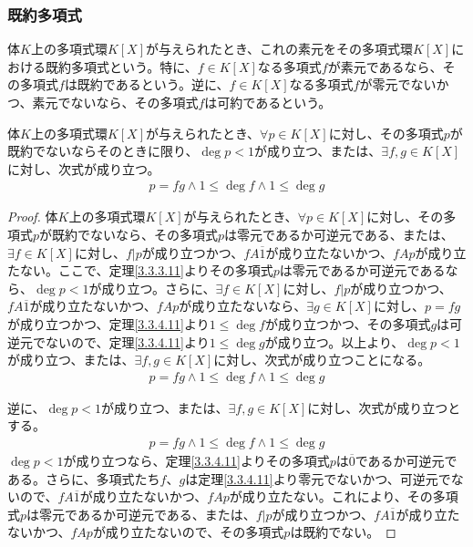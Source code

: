 \documentclass[dvipdfmx]{jsarticle}
\begin{document}
\subsubsection{既約多項式}%
\begin{dfn}
体$K$上の多項式環$K[ X]$が与えられたとき、これの素元をその多項式環$K[ X]$における既約多項式という。特に、$f \in K[ X]$なる多項式$f$が素元であるなら、その多項式$f$は既約であるという。逆に、$f \in K[ X]$なる多項式$f$が零元でないかつ、素元でないなら、その多項式$f$は可約であるという。
\end{dfn}
\begin{thm}\label{3.3.4.18}
体$K$上の多項式環$K[ X]$が与えられたとき、$\forall p \in K[ X]$に対し、その多項式$p$が既約でないならそのときに限り、$\deg p < 1$が成り立つ、または、$\exists f,g \in K[ X]$に対し、次式が成り立つ。
\begin{align*}
p = fg \land 1 \leq \deg f \land 1 \leq \deg g
\end{align*}
\end{thm}
\begin{proof}
体$K$上の多項式環$K[ X]$が与えられたとき、$\forall p \in K[ X]$に対し、その多項式$p$が既約でないなら、その多項式$p$は零元であるか可逆元である、または、$\exists f \in K[ X]$に対し、$f|p$が成り立つかつ、$fA\overline{1}$が成り立たないかつ、$fAp$が成り立たない。ここで、定理\ref{3.3.3.11}よりその多項式$p$は零元であるか可逆元であるなら、$\deg p < 1$が成り立つ。さらに、$\exists f \in K[ X]$に対し、$f|p$が成り立つかつ、$fA\overline{1}$が成り立たないかつ、$fAp$が成り立たないなら、$\exists g \in K[ X]$に対し、$p = fg$が成り立つかつ、定理\ref{3.3.4.11}より$1 \leq \deg f$が成り立つかつ、その多項式$g$は可逆元でないので、定理\ref{3.3.4.11}より$1 \leq \deg g$が成り立つ。以上より、$\deg p < 1$が成り立つ、または、$\exists f,g \in K[ X]$に対し、次式が成り立つことになる。
\begin{align*}
p = fg \land 1 \leq \deg f \land 1 \leq \deg g
\end{align*}\par
逆に、$\deg p < 1$が成り立つ、または、$\exists f,g \in K[ X]$に対し、次式が成り立つとする。
\begin{align*}
p = fg \land 1 \leq \deg f \land 1 \leq \deg g
\end{align*}
$\deg p < 1$が成り立つなら、定理\ref{3.3.4.11}よりその多項式$p$は$\overline{0}$であるか可逆元である。さらに、多項式たち$f$、$g$は定理\ref{3.3.4.11}より零元でないかつ、可逆元でないので、$fA\overline{1}$が成り立たないかつ、$fAp$が成り立たない。これにより、その多項式$p$は零元であるか可逆元である、または、$f|p$が成り立つかつ、$fA\overline{1}$が成り立たないかつ、$fAp$が成り立たないので、その多項式$p$は既約でない。
\end{proof}
\end{document}
